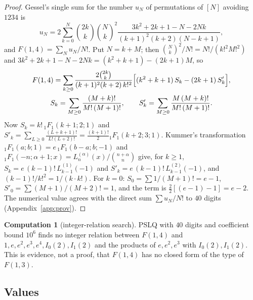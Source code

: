 \documentclass[11pt]{article}
\theoremstyle{definition}
\newtheorem{computation}[theorem]{Computation}
\theoremstyle{remark}
\begin{document}
\begin{proof}
Gessel's single sum for the number $u_N$ of permutations of $[N]$ avoiding $1234$ is
\[
u_N=2\sum_{k=0}^N\binom{2k}{k}\binom Nk^2\frac{3k^2+2k+1-N-2Nk}{(k+1)^2(k+2)(N-k+1)},
\]
and $F(1,4)=\sum_Nu_N/N!$. Put $N=k+M$; then $\binom Nk^2/N!=N!/(k!^2M!^2)$ and $3k^2+2k+1-N-2Nk=(k^2+k+1)-(2k+1)M$, so
\begin{gather*}
F(1,4)=\sum_{k\ge0}\frac{2\binom{2k}k}{(k+1)^2(k+2)\,k!^2}\Bigl[(k^2+k+1)\,S_k-(2k+1)\,S'_k\Bigr],\\
S_k=\sum_{M\ge0}\frac{(M+k)!}{M!\,(M+1)!},\qquad S'_k=\sum_{M\ge0}\frac{M\,(M+k)!}{M!\,(M+1)!}.
\end{gather*}
Now $S_k=k!\,{}_1F_1(k+1;2;1)$ and $S'_k=\sum_{L\ge0}\frac{(L+k+1)!}{L!(L+2)!}=\frac{(k+1)!}2{}_1F_1(k+2;3;1)$. Kummer's transformation ${}_1F_1(a;b;1)=e\,{}_1F_1(b-a;b;-1)$ and ${}_1F_1(-n;\alpha+1;x)=L^{(\alpha)}_n(x)/\binom{n+\alpha}n$ give, for $k\ge1$, $S_k=e\,(k-1)!\,L^{(1)}_{k-1}(-1)$ and $S'_k=e\,(k-1)!\,L^{(2)}_{k-1}(-1)$, and $(k-1)!/k!^2=1/(k\cdot k!)$. For $k=0$: $S_0=\sum1/(M+1)!=e-1$, $S'_0=\sum(M+1)/(M+2)!=1$, and the term is $\frac22[(e-1)-1]=e-2$. The numerical value agrees with the direct sum $\sum u_N/N!$ to $40$ digits (Appendix~\ref{app:prov}).
\end{proof}

\begin{computation}[integer-relation search]
PSLQ with $40$ digits and coefficient bound $10^6$ finds no integer relation between $F(1,4)$ and $1,e,e^2,e^3,e^4,I_0(2),I_1(2)$ and the products of $e,e^2,e^3$ with $I_0(2),I_1(2)$. This is evidence, not a proof, that $F(1,4)$ has no closed form of the type of $F(1,3)$.
\end{computation}

\subsection{Values}
\end{document}
